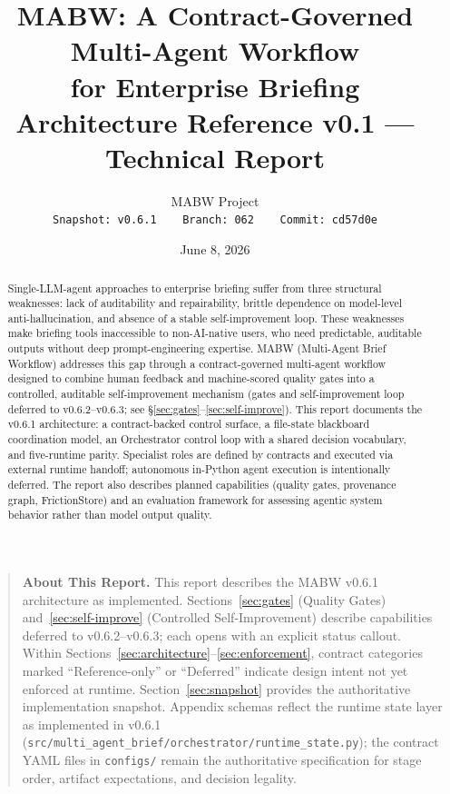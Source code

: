 \documentclass[11pt,a4paper]{article}
\title{\textbf{MABW: A Contract-Governed Multi-Agent Workflow\\for Enterprise Briefing}\\[6pt]
       \large Architecture Reference v0.1 --- Technical Report}
\author{MABW Project\\
        \texttt{Snapshot: v0.6.1 \,\textbar\, Branch: 062 \,\textbar\, Commit: cd57d0e}}
\date{June 8, 2026}
\begin{document}
\maketitle
\thispagestyle{fancy}

\begin{abstract}
\noindent
Single-LLM-agent approaches to enterprise briefing suffer from three structural weaknesses: lack of auditability and repairability, brittle dependence on model-level anti-hallucination, and absence of a stable self-improvement loop. These weaknesses make briefing tools inaccessible to non-AI-native users, who need predictable, auditable outputs without deep prompt-engineering expertise. MABW (Multi-Agent Brief Workflow) addresses this gap through a contract-governed multi-agent workflow designed to combine human feedback and machine-scored quality gates into a controlled, auditable self-improvement mechanism (gates and self-improvement loop deferred to v0.6.2--v0.6.3; see \S\ref{sec:gates}--\ref{sec:self-improve}). This report documents the v0.6.1 architecture: a contract-backed control surface, a file-state blackboard coordination model, an Orchestrator control loop with a shared decision vocabulary, and five-runtime parity. Specialist roles are defined by contracts and executed via external runtime handoff; autonomous in-Python agent execution is intentionally deferred. The report also describes planned capabilities (quality gates, provenance graph, FrictionStore) and an evaluation framework for assessing agentic system behavior rather than model output quality.
\end{abstract}

\vspace{6pt}
\begin{quote}
\small
\textbf{About This Report.} This report describes the MABW v0.6.1 architecture as implemented. Sections~\ref{sec:gates} (Quality Gates) and~\ref{sec:self-improve} (Controlled Self-Improvement) describe capabilities deferred to v0.6.2--v0.6.3; each opens with an explicit status callout. Within Sections~\ref{sec:architecture}--\ref{sec:enforcement}, contract categories marked ``Reference-only'' or ``Deferred'' indicate design intent not yet enforced at runtime. Section~\ref{sec:snapshot} provides the authoritative implementation snapshot. Appendix schemas reflect the runtime state layer as implemented in v0.6.1 (\texttt{src/multi\_agent\_brief/orchestrator/runtime\_state.py}); the contract YAML files in \texttt{configs/} remain the authoritative specification for stage order, artifact expectations, and decision legality.
\end{quote}
\end{document}

